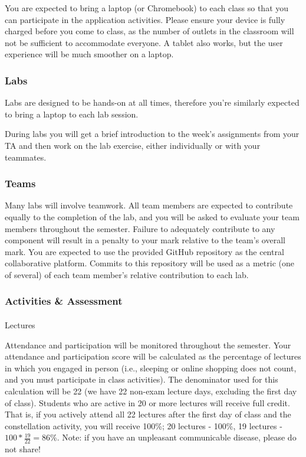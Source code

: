 \documentclass[
  letterpaper,
  DIV=11,
  numbers=noendperiod]{scrartcl}
\makeatletter
\let\oldparagraph\paragraph
\renewcommand{\paragraph}{
    \@ifstar
      \xxxParagraphStar
      \xxxParagraphNoStar
  }
\newcommand{\xxxParagraphStar}[1]{\oldparagraph*{#1}\mbox{}}
\newcommand{\xxxParagraphNoStar}[1]{\oldparagraph{#1}\mbox{}}
\makeatother
\begin{document}
You are expected to bring a laptop (or Chromebook) to each class so that
you can participate in the application activities. Please ensure your
device is fully charged before you come to class, as the number of
outlets in the classroom will not be sufficient to accommodate everyone.
A tablet also works, but the user experience will be much smoother on a
laptop.

\subsubsection{Labs}\label{labs}

Labs are designed to be hands-on at all times, therefore you're
similarly expected to bring a laptop to each lab session.

During labs you will get a brief introduction to the week's assignments
from your TA and then work on the lab exercise, either individually or
with your teammates.

\subsubsection{Teams}\label{teams}

Many labs will involve teamwork. All team members are expected to
contribute equally to the completion of the lab, and you will be asked
to evaluate your team members throughout the semester. Failure to
adequately contribute to any component will result in a penalty to your
mark relative to the team's overall mark. You are expected to use the
provided GitHub repository as the central collaborative platform.
Commits to this repository will be used as a metric (one of several) of
each team member's relative contribution to each lab.

\subsubsection{Activities \& Assessment}\label{activities-assessment}

\paragraph{Lectures}\label{lectures-1}

Attendance and participation will be monitored throughout the semester.
Your attendance and participation score will be calculated as the
percentage of lectures in which you engaged in person (i.e., sleeping or
online shopping does not count, and you must participate in class
activities). The denominator used for this calculation will be 22 (we
have 22 non-exam lecture days, excluding the first day of class).
Students who are active in 20 or more lectures will receive full credit.
That is, if you actively attend all 22 lectures after the first day of
class and the constellation activity, you will receive 100\%; 20
lectures - 100\%, 19 lectures - \(100*\frac{19}{22}=86\)\%. Note: if you
have an unpleasant communicable disease, please do not share!
\end{document}
